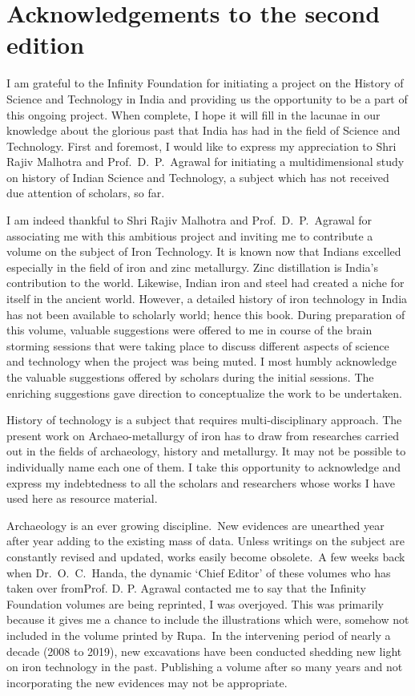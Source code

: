 \chapter*{Acknowledgements to the second edition}\label{acknowledgement}


\vspace{-.7cm}

I am grateful to the Infinity Foundation for initiating a project on the History of Science and Technology in India and providing us the opportunity to be a part of this ongoing project. When complete, I hope it will fill in the lacunae in our knowledge about the glorious past that India has had in the field of Science and Technology. First and foremost,  I would like to express my appreciation to Shri Rajiv Malhotra and Prof.~D.~P.~Agrawal for initiating a multidimensional study on history of Indian Science and Technology, a subject which has not received due attention of scholars, so far. 

I am indeed thankful to Shri Rajiv Malhotra and Prof.~D.~P.~Agrawal for associating me with this ambitious project and inviting me to contribute a volume on the subject of Iron Technology. It is known now that Indians excelled especially in the field of iron and zinc metallurgy. Zinc distillation is India’s contribution to the world. Likewise, Indian iron and steel had created a niche for itself in the ancient world.  However, a detailed history of iron technology in India has not been available to scholarly world; hence this book. During preparation of this volume, valuable suggestions were offered to me in course of the brain storming sessions that were taking place to discuss different aspects of science and technology when the project was being muted. I most humbly acknowledge the valuable suggestions offered by scholars during the initial sessions. The enriching suggestions gave direction to conceptualize the work to be undertaken. 

History of technology is a subject that requires multi-disciplinary approach. The present work on Archaeo-metallurgy of iron has to draw from researches carried out in the fields of archaeology, history and metallurgy. It may not be possible to individually name each one of them. I take this opportunity to acknowledge and express my indebtedness to all the scholars and researchers whose works I have used here as resource material. 

Archaeology is an ever growing discipline.~New evidences are unearthed year after year adding to the existing mass of data. Unless writings on the subject are constantly revised and updated, works easily become obsolete.~A few weeks back when Dr.~O.~C.~Handa, the dynamic ‘Chief Editor’ of these volumes who has taken over from\break Prof. D. P. Agrawal contacted me to say that the Infinity Foundation volumes are being reprinted, I was overjoyed. This was primarily because it gives me a chance to include the illustrations which were, somehow not included in the volume printed by Rupa.~In the intervening period of nearly a decade (2008 to 2019), new excavations have been conducted shedding new light on iron technology in the past. Publishing a volume after so many years and not incorporating the new evidences may not be appropriate. 


